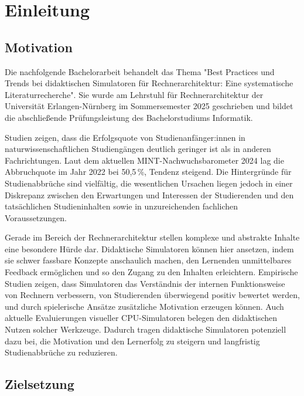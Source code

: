 \chapter{Einleitung}

\section{Motivation}

Die nachfolgende Bachelorarbeit behandelt das Thema "Best Practices und Trends bei didaktischen Simulatoren für Rechnerarchitektur: Eine systematische Literaturrecherche". Sie wurde am Lehrstuhl für Rechnerarchitektur der Universität Erlangen-Nürnberg im Sommersemester 2025 geschrieben und bildet die abschließende Prüfungsleistung des Bachelorstudiums Informatik.

Studien zeigen, dass die Erfolgsquote von Studienanfänger:innen in naturwissenschaftlichen Studiengängen deutlich geringer ist als in anderen Fachrichtungen.\parencite[S. 370]{burdinski_lehrvideos_2024} Laut dem aktuellen MINT-Nachwuchsbarometer 2024 lag die Abbruchquote im Jahr 2022 bei 50,5\,\%, Tendenz steigend. Die Hintergründe für Studienabbrüche sind vielfältig, die wesentlichen Ursachen liegen jedoch in einer Diskrepanz zwischen den Erwartungen und Interessen der Studierenden und den tatsächlichen Studieninhalten sowie in unzureichenden fachlichen Voraussetzungen.\parencite[S. 21]{joachim_herz_stiftung_mint_2024}

Gerade im Bereich der Rechnerarchitektur stellen komplexe und abstrakte Inhalte eine besondere Hürde dar. Didaktische Simulatoren können hier ansetzen, indem sie schwer fassbare Konzepte anschaulich machen, den Lernenden unmittelbares Feedback ermöglichen und so den Zugang zu den Inhalten erleichtern. Empirische Studien zeigen, dass Simulatoren das Verständnis der internen Funktionsweise von Rechnern verbessern,\parencite[S. 215]{prasad_using_2015} von Studierenden überwiegend positiv bewertet werden,\parencite[S. 8]{besim_understanding_2012} und durch spielerische Ansätze zusätzliche Motivation erzeugen können.\parencite[S. 453]{schlag_gamifizierung_nodate} Auch aktuelle Evaluierungen visueller CPU-Simulatoren belegen den didaktischen Nutzen solcher Werkzeuge.\parencite[S. 11]{maxnuck_soares_use_2016}\parencite[S. 75]{cortinovis_further_2024} Dadurch tragen didaktische Simulatoren potenziell dazu bei, die Motivation und den Lernerfolg zu steigern und langfristig Studienabbrüche zu reduzieren.

\section{Zielsetzung}

